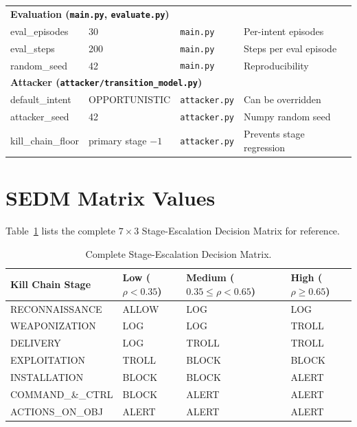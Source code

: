 \begin{longtable}{p{3.8cm}p{2.6cm}p{3.5cm}p{3.2cm}}
  \multicolumn{4}{l}{\textbf{Evaluation (\texttt{main.py}, \texttt{evaluate.py})}} \\[3pt]
  eval\_episodes     & 30          & \texttt{main.py}     & Per-intent episodes \\
  eval\_steps        & 200         & \texttt{main.py}     & Steps per eval episode \\
  random\_seed       & 42          & \texttt{main.py}     & Reproducibility \\

  \multicolumn{4}{l}{\textbf{Attacker (\texttt{attacker/transition\_model.py})}} \\[3pt]
  default\_intent    & OPPORTUNISTIC & \texttt{attacker.py} & Can be overridden \\
  attacker\_seed     & 42          & \texttt{attacker.py} & Numpy random seed \\
  kill\_chain\_floor & primary stage $-1$ & \texttt{attacker.py} & Prevents stage regression \\
\end{longtable}

\section{SEDM Matrix Values}

Table~\ref{tab:sedm_full} lists the complete $7 \times 3$ Stage-Escalation
Decision Matrix for reference.

\begin{table}[ht]
  \centering
  \caption{Complete Stage-Escalation Decision Matrix.}
  \label{tab:sedm_full}
  \begin{tabular}{lp{2.2cm}p{2.2cm}p{2.2cm}}
    \toprule
    Kill Chain Stage & Low ($\rho < 0.35$) & Medium ($0.35 \leq \rho < 0.65$) & High ($\rho \geq 0.65$) \\
    \midrule
    RECONNAISSANCE   & ALLOW & LOG   & LOG   \\
    WEAPONIZATION    & LOG   & LOG   & TROLL \\
    DELIVERY         & LOG   & TROLL & TROLL \\
    EXPLOITATION     & TROLL & BLOCK & BLOCK \\
    INSTALLATION     & BLOCK & BLOCK & ALERT \\
    COMMAND\_\&\_CTRL & BLOCK & ALERT & ALERT \\
    ACTIONS\_ON\_OBJ & ALERT & ALERT & ALERT \\
    \bottomrule
  \end{tabular}
\end{table}

